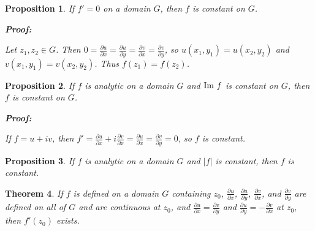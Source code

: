 \documentclass{article}
\theoremstyle{colontheorem}
\newtheorem{theorem}{Theorem}[section]
\newtheorem{proposition}[theorem]{Proposition}
\newcommand{\im}{\textnormal{Im }}
\newenvironment{Theorem}
{
	\begin{mdframed}[backgroundcolor=TheoremOrange!10]
	\begin{theorem}
}
{
	\end{theorem}
	\end{mdframed}
	
	\vspace{.15in}
}
\newenvironment{Proposition}
{
	\begin{mdframed}[backgroundcolor=TheoremOrange!10]
	\begin{proposition}
}
{
	\end{proposition}
	\end{mdframed}
	
	\vspace{.15in}
}
\newenvironment{Proof}
{
	\begin{mdframed}[backgroundcolor=ProofPurple!10]
	\textbf{Proof:}%
}
{
	\end{mdframed}
	
	\vspace{.085in}
}
\begin{document}
\begin{Proposition}
	
	If $f' = 0$ on a domain $G$, then $f$ is constant on $G$.
	
	\begin{Proof}
		Let $z_1, z_2 \in G$. Then $0 = \frac{\partial u}{\partial x} = \frac{\partial u}{\partial y} = \frac{\partial v}{\partial x} = \frac{\partial v}{\partial y}$, so $u(x_1, y_1) = u(x_2, y_2)$ and $v(x_1, y_1) = v(x_2, y_2)$. Thus $f(z_1) = f(z_2)$.
		
	\end{Proof}
	
\end{Proposition}



\begin{Proposition}
	
	If $f$ is analytic on a domain $G$ and $\im f$ is constant on $G$, then $f$ is constant on $G$.
	
	\begin{Proof}
		If $f = u + iv$, then $f' = \frac{\partial u}{\partial x} + i\frac{\partial v}{\partial x} = \frac{\partial u}{\partial x} = \frac{\partial v}{\partial y} = 0$, so $f$ is constant.
		
	\end{Proof}
	
\end{Proposition}



\begin{Proposition}
	
	If $f$ is analytic on a domain $G$ and $|f|$ is constant, then $f$ is constant.
	
\end{Proposition}



\begin{Theorem}
	
	If $f$ is defined on a domain $G$ containing $z_0$, $\frac{\partial u}{\partial x}$, $\frac{\partial u}{\partial y}$, $\frac{\partial v}{\partial x}$, and $\frac{\partial v}{\partial y}$ are defined on all of $G$ and are continuous at $z_0$, and $\frac{\partial u}{\partial x} = \frac{\partial v}{\partial y}$ and $\frac{\partial u}{\partial y} = -\frac{\partial v}{\partial x}$ at $z_0$, then $f'(z_0)$ exists.
	
\end{Theorem}
\end{document}
